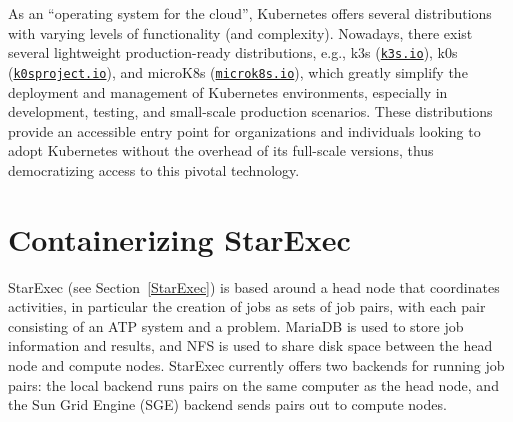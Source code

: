 \documentclass{easychair}
\begin{document}
As an ``operating system for the cloud'', Kubernetes offers several distributions with varying 
levels of functionality (and complexity). 
Nowadays, there exist several lightweight production-ready distributions, e.g., 
k3s (\href{https://k3s.io/}{\tt k3s.io}), k0s (\href{https://k0sproject.io/}{\tt k0sproject.io}), 
and microK8s (\href{https://microk8s.io/}{\tt microk8s.io}), which greatly simplify the deployment 
and management of Kubernetes environments, especially in development, testing, and small-scale 
production scenarios. 
These distributions provide an accessible entry point for organizations and individuals looking 
to adopt Kubernetes without the overhead of its full-scale versions, thus democratizing access 
to this pivotal technology.

\section{Containerizing StarExec}
\label{ContainerizingStarExec}

StarExec (see Section~\ref{StarExec}) is based around a head node that coordinates activities, 
in particular the creation of jobs as sets of job pairs, with each pair consisting of an ATP 
system and a problem. 
MariaDB is used to store job information and results, and NFS is used to share disk space between 
the head node and compute nodes. 
StarExec currently offers two backends for running job pairs: the local backend runs pairs on 
the same computer as the head node, and the Sun Grid Engine (SGE) backend sends pairs out to 
compute nodes.
\end{document}

